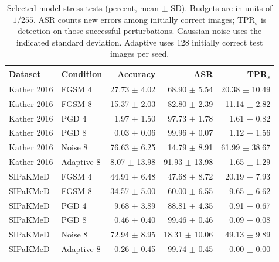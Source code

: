 \begin{table}[t]
\centering
\caption{Selected-model stress tests (percent, mean $\pm$ SD). Budgets are in units of $1/255$. ASR counts new errors among initially correct images; TPR$_s$ is detection on those successful perturbations. Gaussian noise uses the indicated standard deviation. Adaptive uses 128 initially correct test images per seed.}
\label{tab:attacks}
\small
\setlength{\tabcolsep}{4pt}
\begin{tabular}{llrrr}
\toprule
Dataset & Condition & Accuracy & ASR & TPR$_s$ \\
\midrule
Kather 2016 & FGSM 4 & 27.73 $\pm$ 4.02 & 68.90 $\pm$ 5.54 & 20.38 $\pm$ 10.49 \\
Kather 2016 & FGSM 8 & 15.37 $\pm$ 2.03 & 82.80 $\pm$ 2.39 & 11.14 $\pm$ 2.82 \\
Kather 2016 & PGD 4 & 1.97 $\pm$ 1.50 & 97.73 $\pm$ 1.78 & 1.61 $\pm$ 0.82 \\
Kather 2016 & PGD 8 & 0.03 $\pm$ 0.06 & 99.96 $\pm$ 0.07 & 1.12 $\pm$ 1.56 \\
Kather 2016 & Noise 8 & 76.63 $\pm$ 6.25 & 14.79 $\pm$ 8.91 & 61.99 $\pm$ 38.67 \\
Kather 2016 & Adaptive 8 & 8.07 $\pm$ 13.98 & 91.93 $\pm$ 13.98 & 1.65 $\pm$ 1.29 \\
SIPaKMeD & FGSM 4 & 44.91 $\pm$ 6.48 & 47.68 $\pm$ 8.72 & 20.19 $\pm$ 7.93 \\
SIPaKMeD & FGSM 8 & 34.57 $\pm$ 5.00 & 60.00 $\pm$ 6.55 & 9.65 $\pm$ 6.62 \\
SIPaKMeD & PGD 4 & 9.68 $\pm$ 3.89 & 88.81 $\pm$ 4.35 & 0.91 $\pm$ 0.67 \\
SIPaKMeD & PGD 8 & 0.46 $\pm$ 0.40 & 99.46 $\pm$ 0.46 & 0.09 $\pm$ 0.08 \\
SIPaKMeD & Noise 8 & 72.94 $\pm$ 8.95 & 18.31 $\pm$ 10.06 & 49.13 $\pm$ 9.89 \\
SIPaKMeD & Adaptive 8 & 0.26 $\pm$ 0.45 & 99.74 $\pm$ 0.45 & 0.00 $\pm$ 0.00 \\
\bottomrule
\end{tabular}
\end{table}
